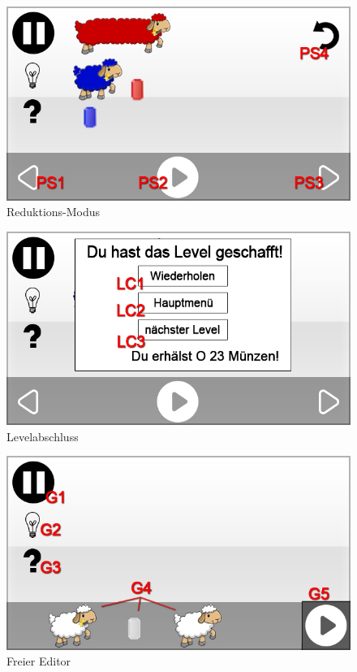 \begin{figure}[H]
\centering
\includegraphics[scale=0.55]{../gui/_jpeg_numeration/game_play_started.jpg}
\caption{Reduktions-Modus}
\label{fig:Reduktions-Modus}
\end{figure}

\begin{figure}[H]
\centering
\includegraphics[scale=0.55]{../gui/_jpeg_numeration/game_completed.jpg}
\caption{Levelabschluss}
\label{fig:Reduktions-Modus_Levelabschluss}
\end{figure}

\begin{figure}[H]
\centering
\includegraphics[scale=0.55]{../gui/_jpeg_numeration/game_freemode.jpg}
\caption{Freier Editor}
\label{fig:Freier Editor}
\end{figure}

